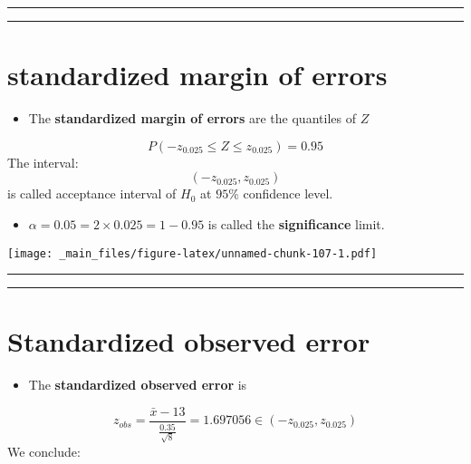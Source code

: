 \documentclass[
]{book}
\providecommand{\tightlist}{%
  \setlength{\itemsep}{0pt}\setlength{\parskip}{0pt}}
\begin{document}
\begin{center}\rule{0.5\linewidth}{0.5pt}\end{center}

\begin{center}\rule{0.5\linewidth}{0.5pt}\end{center}

\hypertarget{standardized-margin-of-errors}{%
\section{standardized margin of errors}\label{standardized-margin-of-errors}}

\begin{itemize}
\tightlist
\item
  The \textbf{standardized margin of errors} are the quantiles of \(Z\)
\end{itemize}

\[P(-z_{0.025} \leq Z \leq z_{0.025})=0.95\]
The interval: \[(-z_{0.025}, z_{0.025})\] is called acceptance interval of \(H_0\) at \(95\%\) confidence level.

\begin{itemize}
\tightlist
\item
  \(\alpha=0.05=2\times 0.025=1-0.95\) is called the \textbf{significance} limit.
\end{itemize}

\texttt{[image: \_main\_files/figure-latex/unnamed-chunk-107-1.pdf]}

\begin{center}\rule{0.5\linewidth}{0.5pt}\end{center}

\begin{center}\rule{0.5\linewidth}{0.5pt}\end{center}

\hypertarget{standardized-observed-error}{%
\section{Standardized observed error}\label{standardized-observed-error}}

\begin{itemize}
\tightlist
\item
  The \textbf{standardized observed error} is
\end{itemize}

\[z_{obs}=\frac{\bar{x}-13}{\frac{0.35}{\sqrt{8}}}=1.697056 \in (-z_{0.025}, z_{0.025})\]
We conclude:
\end{document}
